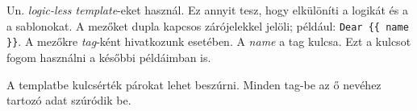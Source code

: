 Un. \textit{logic-less template}-eket használ.
Ez annyit tesz, hogy elkülöníti a logikát és a a sablonokat.
A mezőket dupla kapcsos zárójelekkel jelöli; például: \texttt{Dear \{\{ name \}\}}.
A mezőkre \textit{tag}-ként hivatkozunk esetében.
A \textit{name} a tag kulcsa.
Ezt a kulcsot fogom használni a későbbi példáimban is.

A templatbe kulcsérték párokat lehet beszúrni.
Minden tag-be az ő nevéhez tartozó adat szúródik be.


